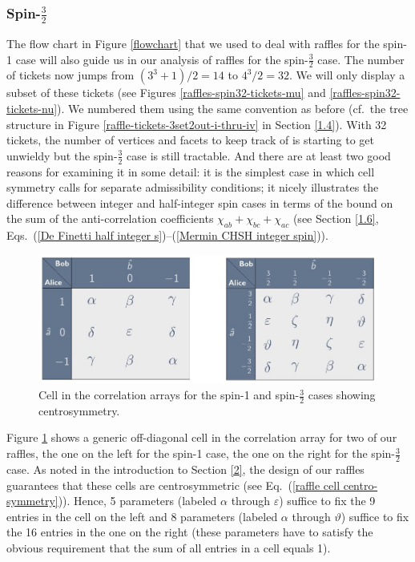 \subsubsection{Spin-$\frac32$} \label{2.2.3}


The flow chart in Figure \ref{flowchart} that we used to deal with raffles for the spin-1 case will also guide us in our analysis of raffles for the spin-$\frac32$ case. The number of tickets now jumps from $(3^3 +1)/2 = 14$ to $4^3/2 = 32$. We will only display a subset of these tickets (see Figures \ref{raffles-spin32-tickets-mu} and \ref{raffles-spin32-tickets-nu}). We numbered them using the same convention as before (cf.\ the tree structure in Figure \ref{raffle-tickets-3set2out-i-thru-iv} in Section \ref{1.4}). With 32 tickets, the number of vertices and facets to keep track of is starting to get unwieldy but the spin-$\frac32$ case is still tractable. And there are at least two good reasons for examining it in some detail: it is the simplest case in which cell symmetry calls for separate admissibility conditions; it nicely illustrates the difference between integer and half-integer spin cases in terms of the bound on the sum of the anti-correlation coefficients $\chi_{ab} + \chi_{bc} + \chi_{ac}$ (see Section \ref{1.6}, Eqs.\ (\ref{De Finetti half integer s})--(\ref{Mermin CHSH integer spin})).

\begin{figure}[h]
 \centering
   \includegraphics[width=5in]{symmetry-spin-1-32.jpeg} 
   \caption{Cell in the correlation arrays for the spin-1 and spin-$\frac32$ cases showing centrosymmetry.}
   \label{symmetry-spin-1-32}
\end{figure}

Figure \ref{symmetry-spin-1-32} shows a generic off-diagonal cell in the correlation array for two of our raffles, the one on the left for the spin-1 case, the one on the right for the spin-$\frac32$ case. As noted in the introduction to Section \ref{2}, the design of our raffles guarantees that these cells are centrosymmetric (see Eq.\ (\ref{raffle cell centro-symmetry})). Hence, 5 parameters (labeled $\alpha$ through $\varepsilon$) suffice to fix the 9 entries in the cell on the left and 8 parameters (labeled $\alpha$ through $\vartheta$) suffice to fix the 16 entries in the one on the right (these parameters have to satisfy the obvious requirement that the sum of all entries in a cell equals 1). 

